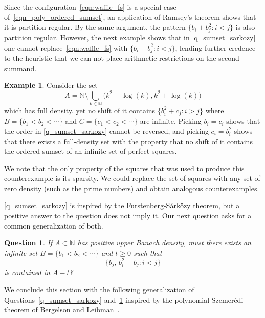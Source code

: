 \documentclass[10pt,dvipsnames]{article}
\newtheorem{question}[theorem]{Question}
\theoremstyle{definition}
\newtheorem{example}[theorem]{Example}
\theoremstyle{plain}
\newcommand{\N}{\mathbb{N}}
\newcommand{\Sarkozy}{S\'{a}rk\"{o}zy}
\newcommand{\Szemeredi}{Szemer\'{e}di}
\begin{document}
Since the configuration~\eqref{eqn:waffle_fs} is a special case of~\eqref{eqn_poly_ordered_sumset}, an application of Ramsey's theorem shows that it is partition regular.
By the same argument, the pattern $\{b_i + b_j^2 : i<j\}$ is also partition regular.
However, the next example shows that in \cref{q_sumset_sarkozy} one cannot replace~\eqref{eqn:waffle_fs} with $\{b_i+b_j^2: i<j\}$, lending  further credence to the heuristic that we can not place arithmetic restrictions on the second summand. 



\begin{example}
\label{ex_reverse_restricted_sumset_squares_is_false}
Consider the set
\[
A=\N\setminus \bigcup_{k\in\N} \big(k^2-\log(k), k^2+\log(k)\big)
\]
which has full density, yet no shift of it contains $\{b_i^2+c_j: i>j\}$ where $B=\{b_1< b_2< \cdots \}$ and $C=\{c_1< c_2< \cdots \}$ are infinite. Picking $b_i=c_i$ shows that the order in \cref{q_sumset_sarkozy} cannot be reversed, and picking $c_i=b_i^2$ shows that there exists a full-density set with the property that no shift of it contains the ordered sumset of an infinite set of perfect squares.

We note that the only property of the squares that was used to produce this counterexample is its sparsity. We could replace the set of squares with any set of zero density (such as the prime numbers) and obtain analogous counterexamples.
\end{example}


\cref{q_sumset_sarkozy} is inspired by the Furstenberg-\Sarkozy{} theorem, but a positive answer to the question does not imply it.
Our next question asks for a common generalization of both.

\begin{question}
\label{q_sumset_sarkozy_basepoint}
If $A\subset\N$ has positive upper Banach density, must there exists an infinite set $B=\{b_1< b_2<\cdots\}$ and $t\geq 0$ such that
\begin{equation}
\label{eqn:waffle_fs2}
\{b_j,\, b_i^2+b_j: i<j\}
\end{equation}
is contained in $A-t$?
\end{question}

We conclude this section with the following generalization of Questions~\ref{q_sumset_sarkozy} and~\ref{q_sumset_sarkozy_basepoint} inspired by the polynomial \Szemeredi{} theorem of Bergelson and Leibman~\cite{bergelson-leibman}.
\end{document}
